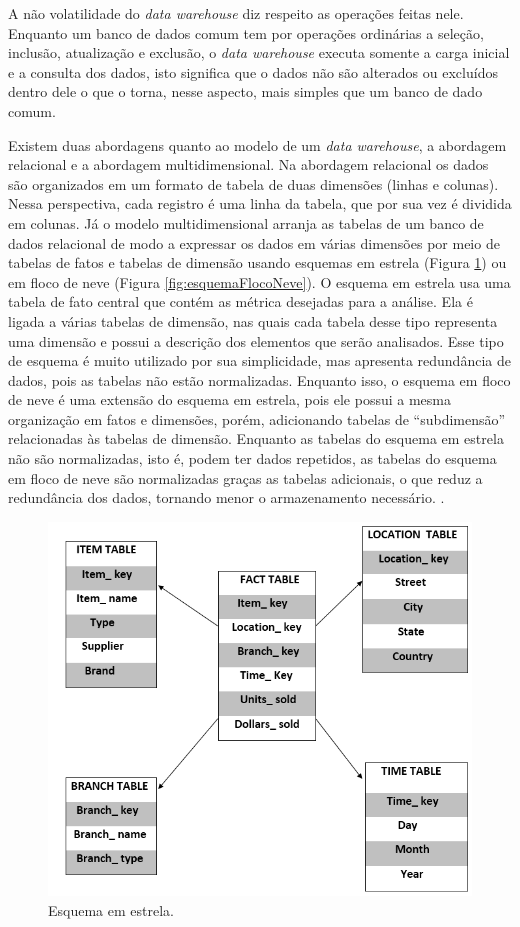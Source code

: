 A não volatilidade do \textit{data warehouse} diz respeito as operações feitas nele. Enquanto um banco de dados comum tem por operações ordinárias a seleção, inclusão, atualização e exclusão, o \textit{data warehouse} executa somente a carga inicial e a consulta dos dados, isto significa que o dados não são alterados ou excluídos dentro dele o que o torna, nesse aspecto, mais simples que um banco de dado comum.

Existem duas abordagens quanto ao modelo de um \textit{data warehouse}, a abordagem relacional e a abordagem multidimensional. Na abordagem relacional os dados são organizados em um formato de tabela de duas dimensões (linhas e colunas). Nessa perspectiva, cada registro é uma linha da tabela, que por sua vez é dividida em colunas. Já o modelo multidimensional arranja as tabelas de um banco de dados relacional de modo a expressar os dados em várias dimensões por meio de tabelas de fatos e tabelas de dimensão usando esquemas em estrela (Figura \ref{fig:esquemaEstrela}) ou em floco de neve (Figura \ref{fig:esquemaFlocoNeve}). O esquema em estrela usa uma tabela de fato central que contém as métrica desejadas para a análise. Ela é ligada a várias tabelas de dimensão, nas quais cada tabela desse tipo representa uma dimensão e possui a descrição dos elementos que serão analisados. Esse tipo de esquema é muito utilizado por sua simplicidade, mas apresenta redundância de dados, pois as tabelas não estão normalizadas. Enquanto isso, o esquema em floco de neve é uma extensão do esquema em estrela, pois ele possui a mesma organização em fatos e dimensões, porém, adicionando tabelas de \enquote{subdimensão} relacionadas às tabelas de dimensão. Enquanto as tabelas do esquema em estrela não são normalizadas, isto é, podem ter dados repetidos, as tabelas do esquema em floco de neve são normalizadas graças as tabelas adicionais, o que reduz a redundância dos dados, tornando menor o armazenamento necessário. \cite{vida2021datawarehouse}.

\begin{figure}[ht]
\centering
\includegraphics[width=.8\textwidth]{imagens/example-star-schema.png}
\caption{Esquema em estrela.}
\author{Fonte: https://www.educba.com/star-schema-vs-snowflake-schema/}
\label{fig:esquemaEstrela}
\end{figure}

